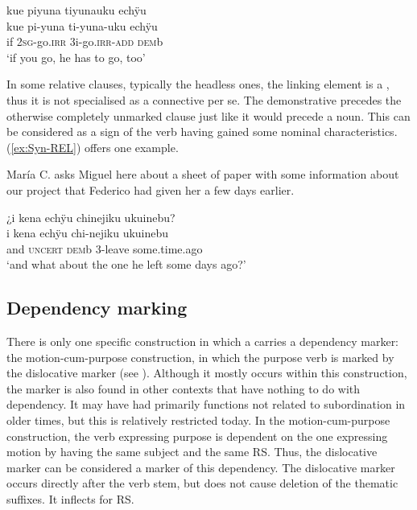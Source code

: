 \ea\label{ex:Syn-kue-2}
\begingl
\glpreamble kue piyuna tiyunauku echÿu\\
\gla kue pi-yuna ti-yuna-uku echÿu\\
\glb if 2\textsc{sg}-go.\textsc{irr} 3i-go.\textsc{irr}-\textsc{add} \textsc{dem}b\\
\glft ‘if you go, he has to go, too’
\endgl
\trailingcitation{[mux-c110810l.042]}
\xe

In some relative clauses, typically the headless ones, the linking element is a , thus it is not specialised as a connective per se. The demonstrative precedes the otherwise completely unmarked clause just like it would precede a noun. This can be considered as a sign of the verb having gained some nominal characteristics. (\ref{ex:Syn-REL}) offers one example.

María C. asks Miguel here about a sheet of paper with some information about our project that Federico had given her a few days earlier.

\ea\label{ex:Syn-REL}
\begingl
\glpreamble ¿i kena echÿu chinejiku ukuinebu?\\
\gla i kena echÿu chi-nejiku ukuinebu\\
\glb and \textsc{uncert} \textsc{dem}b 3-leave some.time.ago\\
\glft ‘and what about the one he left some days ago?’
\endgl
\trailingcitation{[mux-c110810l.131]}
\xe
{}

\subsection{Dependency marking}\label{sec:ConstructionTypePA}

There is only one specific construction in which a  carries a dependency marker: the motion-cum-purpose construction, in which the purpose verb is marked by the dislocative marker (see ). Although it mostly occurs within this construction, the marker is also found in other contexts that have nothing to do with dependency. It may have had primarily functions not related to subordination in older times, but this is relatively restricted today. In the motion-cum-purpose construction, the verb expressing purpose is dependent on the one expressing motion by having the same subject and the same RS. Thus, the dislocative marker can be considered a marker of this dependency. The dislocative marker occurs directly after the verb stem, but does not cause deletion of the thematic suffixes. It inflects for RS. 


